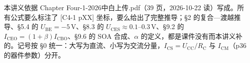 \documentclass[11pt]{ctexart}
\newcommand{\UBE}{U_{\mathrm{BE}}}
\newcommand{\UCC}{U_{\mathrm{CC}}}
\newcommand{\UCES}{U_{\mathrm{CES}}}
\newcommand{\ICM}{I_{\mathrm{CM}}}
\newcommand{\ICS}{I_{\mathrm{CS}}}
\newcommand{\ICEO}{I_{\mathrm{CEO}}}
\newcommand{\ICBO}{I_{\mathrm{CBO}}}
\newcommand{\RC}{R_{\mathrm{C}}}
\begin{document}
\flowerrule

{\small\color{inkgray}
本讲义依据 Chapter Four-1-2026中白上传.pdf（39 页，2026-10-22 读）写成。所有公式要么标注了 [C4-1 pXX] 坐标，要么给出了完整推导；§2 的复合—渡越推导、§5.4 的 $\UBE=-5\,\mathrm{V}$、§8.3 的 $\UCES\approx0.1$--$0.3\,\mathrm{V}$、§9.2 的 $\ICEO=(1+\beta)\ICBO$、§9.6 的 SOA 合成、$\alpha$ 的定义，都是课件没有而本讲义补的。记号按 §0 统一：大写为直流、小写为交流分量，$\ICS=\UCC/\RC$ 与 $\ICM$（p36 的器件参数）分开。\par}
\end{document}
